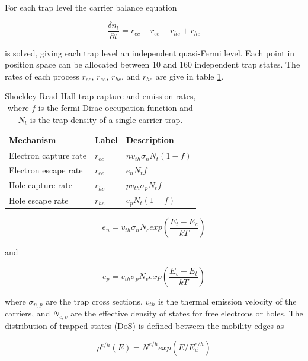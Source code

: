 \documentclass[11pt]{article}
\begin{document}
For each trap level the carrier balance equation

\begin{equation}
\label{eq:taile}
\frac{\delta n_t}{\partial t}=r_{ec}-r_{ee}-r_{hc}+r_{he}
\end{equation}

is solved, giving each trap level an independent quasi-Fermi level. Each point in position space can be allocated between 10 and 160 independent trap states.  The rates of each process $r_{ec}$, $r_{ee}$, $r_{hc}$, and $r_{he}$ are give in table \ref{tab:rates}.

\begin{table}
\begin{center}
  \begin{tabular}{lll}
  \hline
  Mechanism & Label & Description  \\
  \hline
Electron capture rate & $r_{ec}$ & $n v_{th} \sigma_{n} N_{t}(1-f)$ \\
Electron escape rate & $r_{ee}$ & $e_{n} N_{t} f$ \\
Hole capture rate & $r_{hc}$ & $p v_{th} \sigma_{p} N_{t} f$ \\
Hole escape rate & $r_{he}$ & $e_{p} N_{t} (1-f)$\\
  \hline
\end{tabular}
\end{center}
\caption{Shockley-Read-Hall trap capture and emission rates, where $f$ is the fermi-Dirac occupation function and $N_{t}$ is the trap density of a single carrier trap.}
\label{tab:rates}
\end{table}

\begin{equation}
\label{eq:taile}
e_n=v_{th}\sigma_{n} N_{c} exp \left ( \frac{E_t-E_c}{kT}\right )
\end{equation}

and

\begin{equation}
\label{eq:taile}
e_p=v_{th}\sigma_{p} N_{v} exp \left ( \frac{E_v-E_t}{kT}\right )
\end{equation}

 where $\sigma_{n,p}$ are the trap cross sections, $v_{th}$ is the thermal emission velocity of the carriers, and $N_{c,v}$ are the effective density of states for free electrons or holes.  The distribution of trapped states (DoS) is defined between the mobility edges as

\begin{equation}
\label{eq:taile}
\rho^{e/h}(E)=N^{e/h}exp(E/E_{u}^{e/h})
\end{equation}
\end{document}
